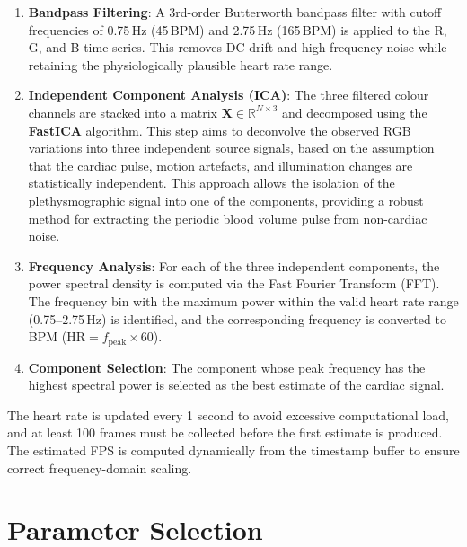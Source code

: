 \documentclass[12pt,a4paper]{article}
\begin{document}
\begin{enumerate}[noitemsep]
    \item \textbf{Bandpass Filtering}: A 3rd-order Butterworth bandpass filter with cutoff frequencies of 0.75\,Hz (45\,BPM) and 2.75\,Hz (165\,BPM) is applied to the R, G, and B time series. This removes DC drift and high-frequency noise while retaining the physiologically plausible heart rate range.
    
    \item \textbf{Independent Component Analysis (ICA)}: The three filtered colour channels are stacked into a matrix $\mathbf{X} \in \mathbb{R}^{N \times 3}$ and decomposed using the \textbf{FastICA} algorithm. This step aims to deconvolve the observed RGB variations into three independent source signals, based on the assumption that the cardiac pulse, motion artefacts, and illumination changes are statistically independent. This approach allows the isolation of the plethysmographic signal into one of the components, providing a robust method for extracting the periodic blood volume pulse from non-cardiac noise.
    
    \item \textbf{Frequency Analysis}: For each of the three independent components, the power spectral density is computed via the Fast Fourier Transform (FFT). The frequency bin with the maximum power within the valid heart rate range (0.75--2.75\,Hz) is identified, and the corresponding frequency is converted to BPM ($\text{HR} = f_{\text{peak}} \times 60$).
    
    \item \textbf{Component Selection}: The component whose peak frequency has the highest spectral power is selected as the best estimate of the cardiac signal.
\end{enumerate}

The heart rate is updated every 1 second to avoid excessive computational load, and at least 100 frames must be collected before the first estimate is produced. The estimated FPS is computed dynamically from the timestamp buffer to ensure correct frequency-domain scaling.

\section{Parameter Selection}\label{sec:params}
\end{document}
